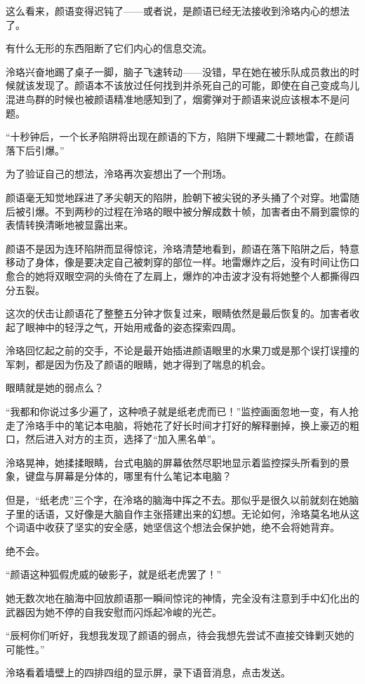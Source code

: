 \documentclass[UTF8, scheme = chinese, openany]{ctexbook}
\begin{document}
这么看来，颜语变得迟钝了——或者说，是颜语已经无法接收到泠珞内心的想法了。

有什么无形的东西阻断了它们内心的信息交流。

泠珞兴奋地踢了桌子一脚，脑子飞速转动——没错，早在她在被乐队成员救出的时候就该发现了。颜语本不该放过任何找到并杀死自己的可能，即使在自己变成鸟儿混进鸟群的时候也被颜语精准地感知到了，烟雾弹对于颜语来说应该根本不是问题。

“十秒钟后，一个长矛陷阱将出现在颜语的下方，陷阱下埋藏二十颗地雷，在颜语落下后引爆。”

为了验证自己的想法，泠珞再次妄想出了一个刑场。

颜语毫无知觉地踩进了矛尖朝天的陷阱，脸朝下被尖锐的矛头捅了个对穿。地雷随后被引爆。不到两秒的过程在泠珞的眼中被分解成数十帧，加害者由不屑到震惊的表情转换清晰地被显露出来。

颜语不是因为连环陷阱而显得惊诧，泠珞清楚地看到，颜语在落下陷阱之后，特意移动了身体，像是要决定自己被刺穿的部位一样。地雷爆炸之后，没有时间让伤口愈合的她将双眼空洞的头倚在了左肩上，爆炸的冲击波才没有将她整个人都撕得四分五裂。

这次的伏击让颜语花了整整五分钟才恢复过来，眼睛依然是最后恢复的。加害者收起了眼神中的轻浮之气，开始用戒备的姿态探索四周。

泠珞回忆起之前的交手，不论是最开始插进颜语眼里的水果刀或是那个误打误撞的军刺，都是因为伤及了颜语的眼睛，她才得到了喘息的机会。

眼睛就是她的弱点么？

“我都和你说过多少遍了，这种喷子就是纸老虎而已！”监控画面忽地一变，有人抢走了泠珞手中的笔记本电脑，将她花了好长时间才打好的解释删掉，换上豪迈的粗口，然后进入对方的主页，选择了“加入黑名单”。

泠珞晃神，她揉揉眼睛，台式电脑的屏幕依然尽职地显示着监控探头所看到的景象，键盘与屏幕是分体的，哪里有什么笔记本电脑？

但是，“纸老虎”三个字，在泠珞的脑海中挥之不去。那似乎是很久以前就刻在她脑子里的话语，又好像是大脑自作主张搭建出来的幻想。无论如何，泠珞莫名地从这个词语中收获了坚实的安全感，她坚信这个想法会保护她，绝不会将她背弃。

绝不会。

“颜语这种狐假虎威的破影子，就是纸老虎罢了！”

她无数次地在脑海中回放颜语那一瞬间惊诧的神情，完全没有注意到手中幻化出的武器因为她不停的自我安慰而闪烁起冷峻的光芒。

“辰柯你们听好，我想我发现了颜语的弱点，待会我想先尝试不直接交锋剿灭她的可能性。”

泠珞看着墙壁上的四排四组的显示屏，录下语音消息，点击发送。
\end{document}

